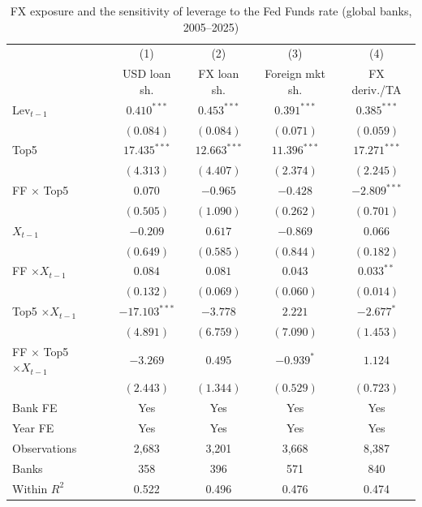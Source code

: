 \documentclass[11pt]{article}
\begin{document}
\clearpage

\begin{table}[htbp]
\centering
\small
\begin{threeparttable}
\caption{FX exposure and the sensitivity of leverage to the Fed Funds rate (global banks, 2005--2025)}
\label{tab:cr_fx}
\begin{tabular}{lcccc}
\toprule
 & (1) & (2) & (3) & (4) \\
 & USD loan sh. & FX loan sh. & Foreign mkt sh. & FX deriv./TA \\
\midrule
Lev$_{t-1}$ & $0.410^{***}$ & $0.453^{***}$ & $0.391^{***}$ & $0.385^{***}$ \\
 & $(0.084)$ & $(0.084)$ & $(0.071)$ & $(0.059)$ \\[2pt]
Top5 & $17.435^{***}$ & $12.663^{***}$ & $11.396^{***}$ & $17.271^{***}$ \\
 & $(4.313)$ & $(4.407)$ & $(2.374)$ & $(2.245)$ \\[2pt]
FF $\times$ Top5 & $0.070$ & $-0.965$ & $-0.428$ & $-2.809^{***}$ \\
 & $(0.505)$ & $(1.090)$ & $(0.262)$ & $(0.701)$ \\[2pt]
$X_{t-1}$ & $-0.209$ & $0.617$ & $-0.869$ & $0.066$ \\
 & $(0.649)$ & $(0.585)$ & $(0.844)$ & $(0.182)$ \\[2pt]
FF $\times X_{t-1}$ & $0.084$ & $0.081$ & $0.043$ & $0.033^{**}$ \\
 & $(0.132)$ & $(0.069)$ & $(0.060)$ & $(0.014)$ \\[2pt]
Top5 $\times X_{t-1}$ & $-17.103^{***}$ & $-3.778$ & $2.221$ & $-2.677^{*}$ \\
 & $(4.891)$ & $(6.759)$ & $(7.090)$ & $(1.453)$ \\[2pt]
FF $\times$ Top5 $\times X_{t-1}$ & $-3.269$ & $0.495$ & $-0.939^{*}$ & $1.124$ \\
 & $(2.443)$ & $(1.344)$ & $(0.529)$ & $(0.723)$ \\
\midrule
Bank FE & Yes & Yes & Yes & Yes \\
Year FE & Yes & Yes & Yes & Yes \\
Observations & 2,683 & 3,201 & 3,668 & 8,387 \\
Banks & 358 & 396 & 571 & 840 \\
Within $R^2$ & 0.522 & 0.496 & 0.476 & 0.474 \\
\bottomrule
\end{tabular}
\begin{tablenotes}[flushleft]
\footnotesize

\end{tablenotes}
\end{threeparttable}
\end{table}
\end{document}
